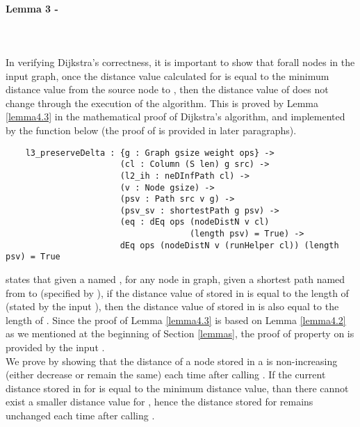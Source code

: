 \paragraph{Lemma 3 - } \label{lemma3V}
\tab\\\\
In verifying Dijkstra's correctness, it is important to show that forall nodes  in the input graph, once the distance value calculated for  is equal to the minimum distance value from the source node to , then the distance value of  does not change through the execution of the algorithm. This is proved by Lemma \ref{lemma4.3} in the mathematical proof of Dijkstra's algorithm, and implemented by the function  below (the proof of  is provided in later paragraphs). 
\begin{lstlisting}
	l3_preserveDelta : {g : Graph gsize weight ops} ->
	                   (cl : Column (S len) g src) ->
	                   (l2_ih : neDInfPath cl) ->
	                   (v : Node gsize) ->
	                   (psv : Path src v g) ->
	                   (psv_sv : shortestPath g psv) ->
	                   (eq : dEq ops (nodeDistN v cl) 
	                   				 (length psv) = True) ->
	                   dEq ops (nodeDistN v (runHelper cl)) (length psv) = True
\end{lstlisting}

 states that given a  named , for any node  in graph, given a shortest path named  from  to  (specified by ), if the distance value of  stored in  is equal to the length of (stated by the input ), then the distance value of  stored in  is also equal to the length of . Since the proof of Lemma \ref{lemma4.3} is based on Lemma \ref{lemma4.2} as we mentioned at the beginning of Section \ref{lemmas}, the proof of property  on  is provided by the input . 
\\

We prove  by showing that the distance of a node  stored in a  is non-increasing (either decrease or remain the same) each time after calling . If the current distance stored in  for  is equal to the minimum distance value, than there cannot exist a smaller distance value for , hence the distance stored for  remains unchanged each time after calling .
\\

